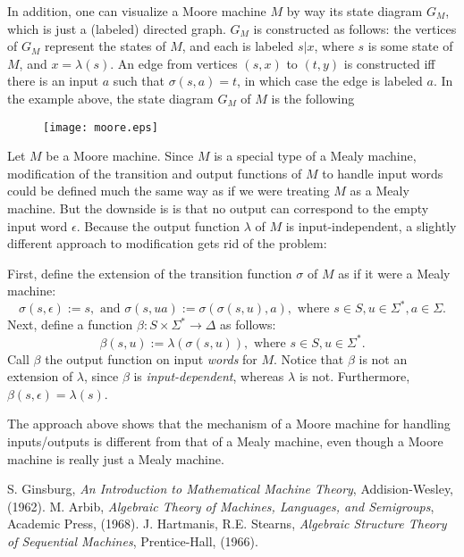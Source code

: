 \documentclass[12pt]{article}
\begin{document}
In addition, one can visualize a Moore machine $M$ by way its state diagram $G_M$, which is just a (labeled) directed graph.  $G_M$ is constructed as follows: the vertices of $G_M$ represent the states of $M$, and each is labeled $s|x$, where $s$ is some state of $M$, and $x=\lambda(s)$.  An edge from vertices $(s,x)$ to $(t,y)$ is constructed iff there is an input $a$ such that $\sigma(s,a)=t$, in which case the edge is labeled $a$.  In the example above, the state diagram $G_M$ of $M$ is the following

\begin{figure}[htp]
\centering
\texttt{[image: moore.eps]}
\end{figure}

Let $M$ be a Moore machine.  Since $M$ is a special type of a Mealy machine, modification of the transition and output functions of $M$ to handle input words could be defined much the same way as if we were treating $M$ as a Mealy machine.  But the downside is is that no output can correspond to the empty input word $\epsilon$.  Because the output function $\lambda$ of $M$ is input-independent, a slightly different approach to modification gets rid of the problem:

First, define the extension of the transition function $\sigma$ of $M$ as if it were a Mealy machine:
$$\sigma(s,\epsilon):=s, \mbox{ and } \sigma(s,ua):=\sigma(\sigma(s,u),a), \mbox{ where }s\in S, u\in \Sigma^*, a\in \Sigma.$$  
Next, define a function $\beta: S\times \Sigma^* \to \Delta$ as follows: 
$$\beta(s,u):=\lambda(\sigma(s,u)), \mbox{ where }s\in S, u\in \Sigma^*.$$  
Call $\beta$ the output function on input \emph{words} for $M$.  Notice that $\beta$ is not an extension of $\lambda$, since $\beta$ is \emph{input-dependent}, whereas $\lambda$ is not.  Furthermore, $\beta(s,\epsilon) = \lambda(s)$.

The approach above shows that the mechanism of a Moore machine for handling inputs/outputs is different from that of a Mealy machine, even though a Moore machine is really just a Mealy machine.

\begin{thebibliography}{8}
 S. Ginsburg, {\em An Introduction to Mathematical Machine Theory}, Addision-Wesley, (1962).
 M. Arbib, \emph{Algebraic Theory of Machines, Languages, and Semigroups}, Academic Press, (1968).
 J. Hartmanis, R.E. Stearns, \emph{Algebraic Structure Theory of Sequential Machines}, Prentice-Hall, (1966).
\end{thebibliography}
\end{document}
